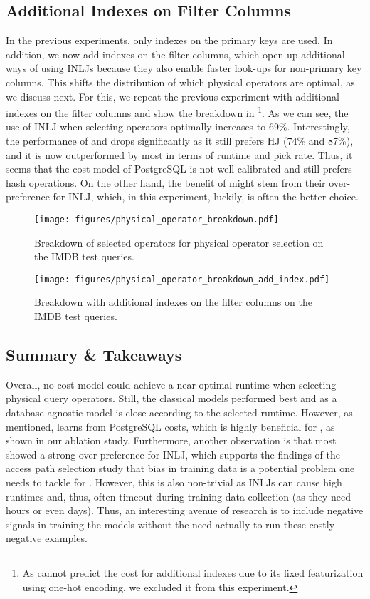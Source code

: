 \subsection{Additional Indexes on Filter Columns}
In the previous experiments, only indexes on the primary keys are used. 
In addition, we now add indexes on the filter columns, which open up additional ways of using INLJs because they also enable faster look-ups for non-primary key columns.
This shifts the distribution of which physical operators are optimal, as we discuss next.
For this, we repeat the previous experiment with additional indexes on the filter columns and show the breakdown in \footnote{As \qppnet cannot predict the cost for additional indexes due to its fixed featurization using one-hot encoding, we excluded it from this experiment.}.
As we can see, the use of INLJ when selecting operators optimally increases to 69\%. 
Interestingly, the performance of \postgresx and \postgresxvi drops significantly as it still prefers HJ (74\% and 87\%), and it is now outperformed by most \lcms in terms of runtime and pick rate.
Thus, it seems that the cost model of PostgreSQL is not well calibrated and still prefers hash operations.
On the other hand, the benefit of \lcms might stem from their over-preference for INLJ, which, in this experiment, luckily, is often the better choice.

\begin{figure*}
    \centering
    \texttt{[image: figures/physical\_operator\_breakdown.pdf]}
    \caption{Breakdown of selected operators for physical operator selection on the IMDB test queries.}
    \label{fig:physical_operator_breakdown}
\end{figure*}

\begin{figure*}
    \centering
    \texttt{[image: figures/physical\_operator\_breakdown\_add\_index.pdf]}
    \caption{Breakdown with additional indexes on the filter columns on the IMDB test queries.}
\label{fig:physical_operator_breakdown_idx}
\end{figure*}

\subsection{Summary \& Takeaways}
Overall, no cost model could achieve a near-optimal runtime when selecting physical query operators. 
Still, the classical models performed best and \dace as a database-agnostic model is close according to the selected runtime.
However, as mentioned, \dace learns from PostgreSQL costs, which is highly beneficial for \dace, as shown in our ablation study. 
Furthermore, another observation is that most \lcms showed a strong over-preference for INLJ, which supports the findings of the access path selection study that bias in training data is a potential problem one needs to tackle for \lcms. 
However, this is also non-trivial as INLJs can cause high runtimes and, thus, often timeout during training data collection (as they need hours or even days). 
Thus, an interesting avenue of research is to include negative signals in training the models without the need actually to run these costly negative examples.